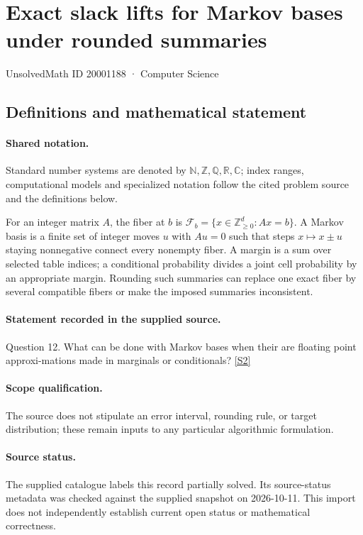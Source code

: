 \documentclass[11pt]{article}
\newcommand{\sref}[2]{\hyperlink{source:#1:#2}{[S#2]}}
\begin{document}
\setcounter{section}{20001187}
\section{Exact slack lifts for Markov bases under rounded summaries}\label{20001188}
{\small\sffamily UnsolvedMath ID 20001188 · Computer Science}
\subsection{Definitions and mathematical statement}

\paragraph{Shared notation.}Standard number systems are denoted by $\mathbb N,\mathbb Z,\mathbb Q,\mathbb R,\mathbb C$; index ranges, computational models and specialized notation follow the cited problem source and the definitions below.


For an integer matrix $A$, the fiber at $b$ is $\mathcal F_b=\{x\in\mathbb Z_{\ge0}^d:Ax=b\}$. A Markov basis is a finite set of integer moves $u$ with $Au=0$ such that steps $x\mapsto x\pm u$ staying nonnegative connect every nonempty fiber. A margin is a sum over selected table indices; a conditional probability divides a joint cell probability by an appropriate margin. Rounding such summaries can replace one exact fiber by several compatible fibers or make the imposed summaries inconsistent.
\paragraph{Statement recorded in the supplied source.}
Question 12. What can be done with Markov bases when their are floating point approxi-mations made in marginals or conditionals? \sref{20001188}{2}
\paragraph{Scope qualification.}
The source does not stipulate an error interval, rounding rule, or target distribution; these remain inputs to any particular algorithmic formulation.
\paragraph{Source status.}
The supplied catalogue labels this record partially solved. Its source-status metadata was checked against the supplied snapshot on 2026-10-11. This import does not independently establish current open status or mathematical correctness.
\end{document}
